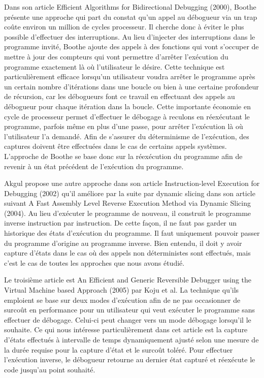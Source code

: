 \documentclass{article}
\begin{document}
Dans son article Efficient Algorithms for Bidirectional Debugging
(2000)\cite{Boothe-2000}, Boothe présente une approche qui part du constat qu'un appel au
débogueur via un trap coûte environ un million de cycles processeur. Il
cherche donc à éviter le plus possible d'effectuer des interruptions. Au
lieu d'injecter des interruptions dans le programme invité, Boothe
ajoute des appels à des fonctions qui vont s'occuper de mettre à jour
des compteurs qui vont permettre d'arrêter l'exécution du programme
exactement là où l'utilisateur le désire. Cette technique est
particulièrement efficace lorsqu'un utilisateur voudra arrêter le
programme après un certain nombre d'itérations dans une boucle ou bien à
une certaine profondeur de récursion, car les débogueurs font ce travail
en effectuant des appels au débogueur pour chaque itération dans la
boucle. Cette importante économie en cycle de processeur permet
d'effectuer le débogage à reculons en réexécutant le programme, parfois
même en plus d'une passe, pour arrêter l'exécution là où l'utilisateur
l'a demandé. Afin de s'assurer du déterminisme de l'exécution, des
captures doivent être effectuées dans le cas de certains appels
systèmes. L'approche de Boothe se base donc sur la réexécution du
programme afin de revenir à un état précédent de l'exécution du
programme.

Akgul propose une autre approche dans son article Instruction-level
Execution for Debugging (2002)\cite{Akgul-2002} qu'il améliore par la suite par dynamic
slicing dans son article suivant A Fast Assembly Level Reverse Execution
Method via Dynamic Slicing (2004). Au lieu d'exécuter le programme de
nouveau, il construit le programme inverse instruction par instruction.
De cette façon, il ne faut pas garder un historique des états
d'exécution du programme. Il faut uniquement pouvoir passer du programme
d'origine au programme inverse. Bien entendu, il doit y avoir capture
d'états dans le cas où des appels non déterministes sont effectués, mais
c'est le cas de toutes les approches que nous avons étudié.

Le troisième article est An Efficient and Generic Reversible Debugger
using the Virtual Machine based Approach (2005) par Koju et al\cite{Koju-2005}. La
technique qu'ils emploient se base sur deux modes d'exécution afin de ne
pas occasionner de surcoût en performance pour un utilisateur qui veut
exécuter le programme sans effectuer de débogage. Celui-ci peut changer
vers un mode débogage lorsqu'il le souhaite. Ce qui nous intéresse
particulièrement dans cet article est la capture d'états effectués à
intervalle de temps dynamiquement ajusté selon une mesure de la durée
requise pour la capture d'état et le surcoût toléré. Pour effectuer
l'exécution inverse, le débogueur retourne au dernier état capturé et
réexécute le code jusqu'au point souhaité.
\end{document}
